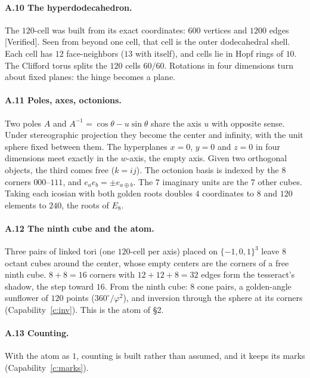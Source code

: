 \documentclass[11pt]{article}
\newcommand{\verified}{\textsf{\small\textcolor{verif}{[Verified]}}}
\theoremstyle{definition}\newtheorem{claim}{Capability}
\theoremstyle{remark}
\begin{document}
\paragraph{A.10 The hyperdodecahedron.} The $120$-cell was built from its exact coordinates: $600$ vertices and $1200$ edges \verified. Seen from beyond one cell, that cell is the outer dodecahedral shell. Each cell has $12$ face-neighbors ($13$ with itself), and cells lie in Hopf rings of $10$. The Clifford torus splits the $120$ cells $60/60$. Rotations in four dimensions turn about fixed planes: the hinge becomes a plane.

\paragraph{A.11 Poles, axes, octonions.} Two poles $A$ and $A^{-1}=\cos\theta-u\sin\theta$ share the axis $u$ with opposite sense. Under stereographic projection they become the center and infinity, with the unit sphere fixed between them. The hyperplanes $x{=}0$, $y{=}0$ and $z{=}0$ in four dimensions meet exactly in the $w$-axis, the empty axis. Given two orthogonal objects, the third comes free ($k=ij$). The octonion basis is indexed by the $8$ corners $000$--$111$, and $e_a e_b=\pm e_{a\oplus b}$. The $7$ imaginary units are the $7$ other cubes. Taking each icosian with both golden roots doubles $4$ coordinates to $8$ and $120$ elements to $240$, the roots of $E_8$.

\paragraph{A.12 The ninth cube and the atom.} Three pairs of linked tori (one $120$-cell per axis) placed on $\{-1,0,1\}^3$ leave $8$ octant cubes around the center, whose empty centers are the corners of a free ninth cube. $8+8=16$ corners with $12+12+8=32$ edges form the tesseract's shadow, the step toward $16$. From the ninth cube: $8$ cone pairs, a golden-angle sunflower of $120$ points ($360^\circ/\varphi^2$), and inversion through the sphere at its corners (Capability~\ref{c:inv}). This is the atom of \S2.

\paragraph{A.13 Counting.} With the atom as $1$, counting is built rather than assumed, and it keeps its marks (Capability~\ref{c:marks}).
\end{document}
